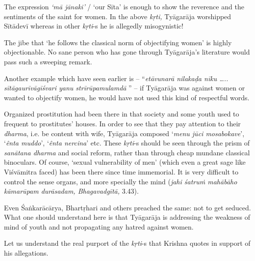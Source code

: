 The expression \textit{‘mā jānaki’} / ‘our Sīta’ is enough to show the reverence and the sentiments of the saint for women. In the above \textit{kṛti,} Tyāgarāja worshipped Sītādevī whereas in other \textit{kṛti}-s he is allegedly misogynistic! 

The jibe that ‘he follows the classical norm of objectifying women’ is highly objectionable. No sane person who has gone through Tyāgarāja’s literature would pass such a sweeping remark. 

Another example which have seen earlier is – “\textit{etāvunarā nilakaḍa nīku ….. sītāgaurīvāgīśvari yanu strīrūpamulamdā} ” – if Tyāgarāja was against women or wanted to objectify women, he would have not used this kind of respectful words.

Organized prostitution had been there in that society and some youth used to frequent to prostitutes’ houses. In order to see that they pay attention to their \textit{dharma}, i.e. be content with wife, Tyāgarāja composed ‘\textit{menu jūci mosabokave}’, ‘\textit{ênta muddo}’, ‘\textit{ênta nercina}’ etc. These \textit{kṛti}-s should be seen through the prism of \textit{sanātana dharma} and social reform, rather than through cheap mundane classical binoculars. Of course, ‘sexual vulnerability of men’ (which even a great sage like Viśvāmitra faced) has been there since time immemorial. It is very difficult to control the sense organs, and more specially the mind (\textit{jahi śatruṁ mahābāho kāmarūpam durāsadam, Bhagavadgītā,} 3.43).

Even Śaṅkarācārya, Bhartṛhari and others preached the same: not to get seduced. What one should understand here is that Tyāgarāja is addressing the weakness of mind of youth and not propagating any hatred against women.

Let us understand the real purport of the \textit{kṛti}-s that Krishna quotes in support of his allegations.

